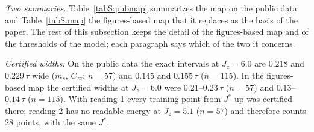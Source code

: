 \documentclass[aps,prx,onecolumn,10pt,nofootinbib,longbibliography,floatfix]{revtex4-2}
\theoremstyle{remark}
\newcommand{\Jz}{J_z}
\newcommand{\ms}{m_s}
\newcommand{\Czz}{\bar C_{zz}}
\begin{document}
\emph{Two summaries.} Table~\ref{tabS:pubmap} summarizes the map on the public data and Table~\ref{tabS:map} the
figures-based map that it replaces as the basis of the paper. The rest of this subsection keeps the detail of the
figures-based map and of the thresholds of the model; each paragraph says which of the two it concerns.

\emph{Certified widths.} On the public data the exact intervals at $\Jz=6.0$ are $0.218$ and $0.229\,\tau$ wide %
($\ms$, $\Czz$; $n=57$) and $0.145$ and $0.155\,\tau$ ($n=115$). In the figures-based map the certified widths at %
$\Jz=6.0$ were $0.21$--$0.23\,\tau$ ($n=57$) and $0.13$--$0.14\,\tau$ %
($n=115$). With reading 1 every training point from $J^*$ up was certified there; reading 2 has no readable energy at
$\Jz=5.1$ ($n=57$) and therefore counts $28$ points, with the same $J^*$. %
\end{document}
